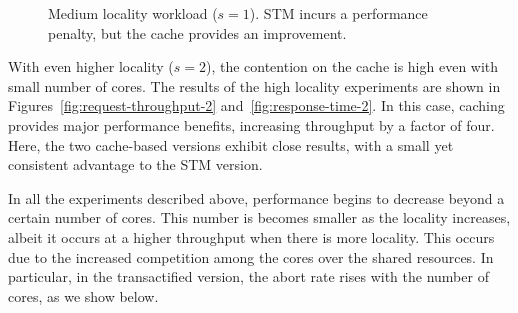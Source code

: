 \documentclass[preprint,11pt]{sigplanconf}
\begin{document}
\begin{figure}
 \centering
 \hfill
 \caption{Medium locality workload ($s = 1$). 
 STM incurs a performance penalty, but the cache provides an improvement.}
\end{figure}

With even higher locality ($s=2$), the contention on the cache is high even with
small number of cores. The results of the high locality experiments are shown
in Figures~\ref{fig:request-throughput-2} and~\ref{fig:response-time-2}.
In this case, caching provides major performance
benefits, increasing throughput by a factor of four. Here, the two 
cache-based versions exhibit close results, with a small yet consistent
advantage to the STM version.

In all the experiments described above, performance begins to decrease
beyond a certain number of cores. This number is becomes smaller as 
the locality increases, albeit it occurs at a higher throughput when
there is more locality. This occurs due to the increased competition
among the cores over the shared resources. In particular, in the 
transactified version, the abort rate rises with the number of cores,
as we show below. 
\end{document}
